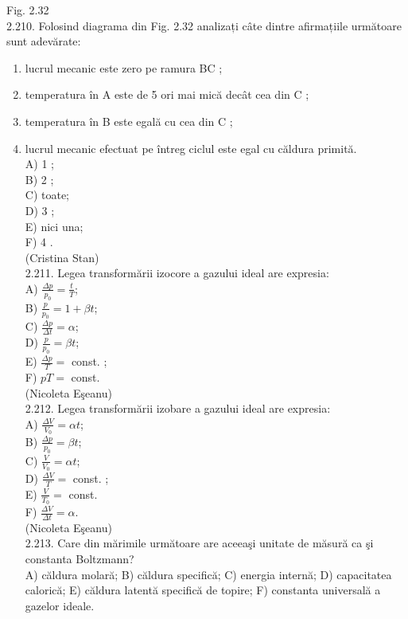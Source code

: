 \documentclass[10pt]{article}
\begin{document}
Fig. 2.32\\
2.210. Folosind diagrama din Fig. 2.32 analizați câte dintre afirmațiile următoare sunt adevărate:

\begin{enumerate}
  \item lucrul mecanic este zero pe ramura BC ;
  \item temperatura în A este de 5 ori mai mică decât cea din C ;
  \item temperatura în B este egală cu cea din C ;
  \item lucrul mecanic efectuat pe întreg ciclul este egal cu căldura primită.\\
A) 1 ;\\
B) 2 ;\\
C) toate;\\
D) 3 ;\\
E) nici una;\\
F) 4 .\\
(Cristina Stan)\\
2.211. Legea transformării izocore a gazului ideal are expresia:\\
A) $\frac{\Delta p}{p_{0}}=\frac{t}{T}$;\\
B) $\frac{p}{p_{0}}=1+\beta t$;\\
C) $\frac{\Delta p}{\Delta t}=\alpha$;\\
D) $\frac{p}{p_{0}}=\beta t$;\\
E) $\frac{\Delta p}{T}=$ const. ;\\
F) $p T=$ const.\\
(Nicoleta Eşeanu)\\
2.212. Legea transformării izobare a gazului ideal are expresia:\\
A) $\frac{\Delta V}{V_{0}}=\alpha t$;\\
B) $\frac{\Delta p}{p_{0}}=\beta t$;\\
C) $\frac{V}{V_{0}}=\alpha t$;\\
D) $\frac{\Delta V}{T}=$ const. ;\\
E) $\frac{V}{T_{0}}=$ const.\\
F) $\frac{\Delta V}{\Delta t}=\alpha$.\\
(Nicoleta Eşeanu)\\
2.213. Care din mărimile următoare are aceeaşi unitate de măsură ca şi constanta Boltzmann?\\
A) căldura molară; B) căldura specifică; C) energia internă; D) capacitatea calorică; E) căldura latentă specifică de topire; F) constanta universală a gazelor ideale.\\

\end{enumerate}
\end{document}
